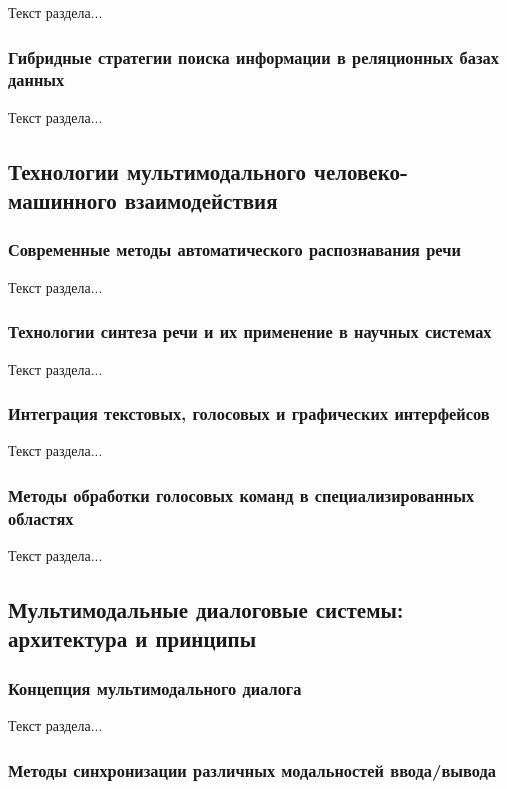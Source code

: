 Текст раздела...

\subsubsection{Гибридные стратегии поиска информации в реляционных базах данных}

Текст раздела...

\subsection{Технологии мультимодального человеко-машинного взаимодействия}

\subsubsection{Современные методы автоматического распознавания речи}

Текст раздела...

\subsubsection{Технологии синтеза речи и их применение в научных системах}

Текст раздела...

\subsubsection{Интеграция текстовых, голосовых и графических интерфейсов}

Текст раздела...

\subsubsection{Методы обработки голосовых команд в специализированных областях}

Текст раздела...

\subsection{Мультимодальные диалоговые системы: архитектура и принципы}

\subsubsection{Концепция мультимодального диалога}

Текст раздела...

\subsubsection{Методы синхронизации различных модальностей ввода/вывода}

